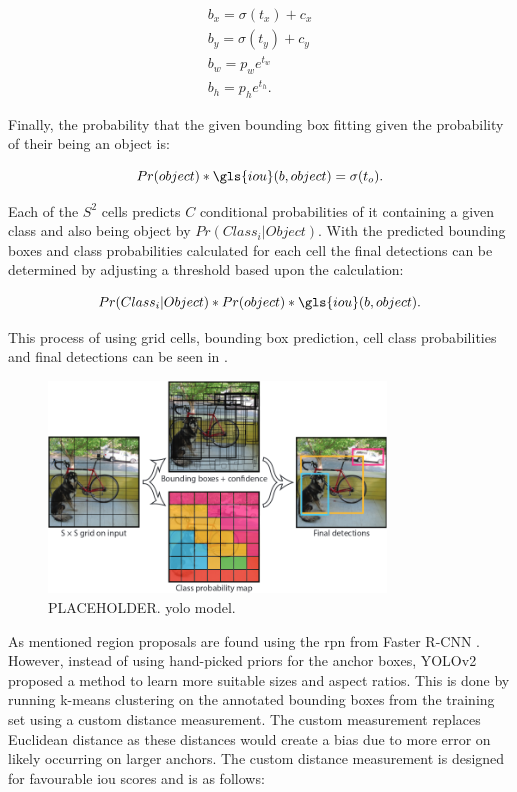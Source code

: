 \begin{equation}
\begin{split}  
  b_x = \sigma(t_x) + c_x \\
  b_y = \sigma(t_y) + c_y \\
  b_w = p_we^{t_w} \\
  b_h = p_he^{t_h}.
\end{split}
\end{equation}

Finally, the probability that the given bounding box fitting given the probability of their being an object is:

\begin{equation}  
  Pr(object) * \gls{iou}(b, object) = \sigma(t_o).  
\end{equation}

Each of the $S^2$ cells predicts $C$ conditional probabilities of it containing a given class and also being object by $Pr(Class_i \rvert Object)$. With the predicted bounding boxes and class probabilities calculated for each cell the final detections can be determined by adjusting a threshold based upon the calculation:

\begin{equation}
  Pr(Class_i \rvert Object) *  Pr(object) * \gls{iou}(b, object). 
\end{equation}

This process of using grid cells, bounding box prediction, cell class probabilities and final detections can be seen in .

\begin{figure}[H]
  \centering
    \includegraphics[width=0.8\textwidth]{Figs/Techanal/yolomodel.png}
      \caption{PLACEHOLDER. \gls{yolo} model.}
    \label{fig:yolomodel}
\end{figure}

As mentioned region proposals are found using the \gls{rpn} from Faster R-CNN \cite{fasterrcnn}. However, instead of using hand-picked priors for the anchor boxes, YOLOv2 proposed a method to learn more suitable sizes and aspect ratios. This is done by running k-means clustering on the annotated bounding boxes from the training set using a custom distance measurement. The custom measurement replaces Euclidean distance as these distances would create a bias due to more error on likely occurring on larger anchors. The custom distance measurement is designed for favourable \gls{iou} scores and is as follows:

